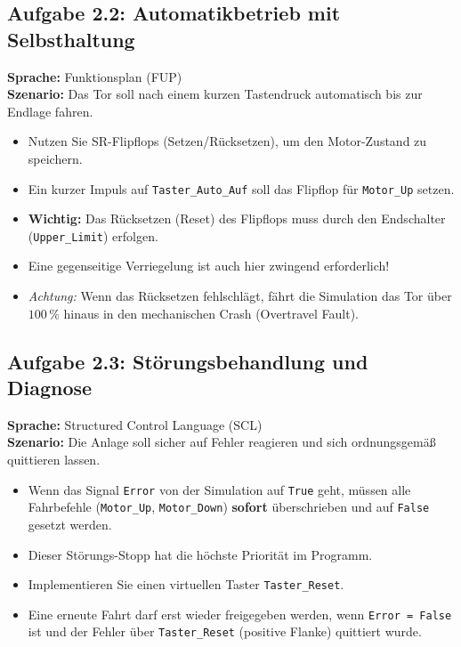 \documentclass[11pt,a4paper]{article}
\begin{document}
\subsection{Aufgabe 2.2: Automatikbetrieb mit Selbsthaltung}
\textbf{Sprache:} Funktionsplan (FUP) \\
\textbf{Szenario:} Das Tor soll nach einem kurzen Tastendruck automatisch bis zur Endlage fahren.
\begin{itemize}
    \item Nutzen Sie SR-Flipflops (Setzen/Rücksetzen), um den Motor-Zustand zu speichern.
    \item Ein kurzer Impuls auf \texttt{Taster\_Auto\_Auf} soll das Flipflop für \texttt{Motor\_Up} setzen.
    \item \textbf{Wichtig:} Das Rücksetzen (Reset) des Flipflops muss durch den Endschalter (\texttt{Upper\_Limit}) erfolgen. 
    \item Eine gegenseitige Verriegelung ist auch hier zwingend erforderlich!
    \item \textit{Achtung:} Wenn das Rücksetzen fehlschlägt, fährt die Simulation das Tor über $100\,\%$ hinaus in den mechanischen Crash (Overtravel Fault).
\end{itemize}

\subsection{Aufgabe 2.3: Störungsbehandlung und Diagnose}
\textbf{Sprache:} Structured Control Language (SCL) \\
\textbf{Szenario:} Die Anlage soll sicher auf Fehler reagieren und sich ordnungsgemäß quittieren lassen.
\begin{itemize}
    \item Wenn das Signal \texttt{Error} von der Simulation auf \texttt{True} geht, müssen alle Fahrbefehle (\texttt{Motor\_Up}, \texttt{Motor\_Down}) \textbf{sofort} überschrieben und auf \texttt{False} gesetzt werden.
    \item Dieser Störungs-Stopp hat die höchste Priorität im Programm.
    \item Implementieren Sie einen virtuellen Taster \texttt{Taster\_Reset}.
    \item Eine erneute Fahrt darf erst wieder freigegeben werden, wenn \texttt{Error = False} ist und der Fehler über \texttt{Taster\_Reset} (positive Flanke) quittiert wurde.
\end{itemize}
\end{document}
